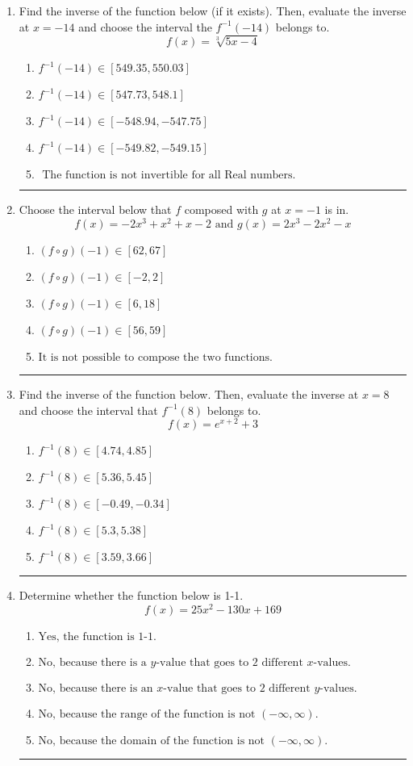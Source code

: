 \documentclass[14pt]{extbook}
\newcommand{\litem}[1]{\item#1\hspace*{-1cm}\rule{\textwidth}{0.4pt}}
\begin{document}
\begin{enumerate}
\litem{
Find the inverse of the function below (if it exists). Then, evaluate the inverse at $x = -14$ and choose the interval the $f^{-1}(-14)$ belongs to.\[ f(x) = \sqrt[3]{5 x - 4} \]\begin{enumerate}[label=\Alph*.]
\item \( f^{-1}(-14) \in [549.35, 550.03] \)
\item \( f^{-1}(-14) \in [547.73, 548.1] \)
\item \( f^{-1}(-14) \in [-548.94, -547.75] \)
\item \( f^{-1}(-14) \in [-549.82, -549.15] \)
\item \( \text{ The function is not invertible for all Real numbers. } \)

\end{enumerate} }
\litem{
Choose the interval below that $f$ composed with $g$ at $x=-1$ is in.\[ f(x) = -2x^{3} + x^{2} +x -2 \text{ and } g(x) = 2x^{3} -2 x^{2} -x \]\begin{enumerate}[label=\Alph*.]
\item \( (f \circ g)(-1) \in [62, 67] \)
\item \( (f \circ g)(-1) \in [-2, 2] \)
\item \( (f \circ g)(-1) \in [6, 18] \)
\item \( (f \circ g)(-1) \in [56, 59] \)
\item \( \text{It is not possible to compose the two functions.} \)

\end{enumerate} }
\litem{
Find the inverse of the function below. Then, evaluate the inverse at $x = 8$ and choose the interval that $f^{-1}(8)$ belongs to.\[ f(x) = e^{x+2}+3 \]\begin{enumerate}[label=\Alph*.]
\item \( f^{-1}(8) \in [4.74, 4.85] \)
\item \( f^{-1}(8) \in [5.36, 5.45] \)
\item \( f^{-1}(8) \in [-0.49, -0.34] \)
\item \( f^{-1}(8) \in [5.3, 5.38] \)
\item \( f^{-1}(8) \in [3.59, 3.66] \)

\end{enumerate} }
\litem{
Determine whether the function below is 1-1.\[ f(x) = 25 x^2 - 130 x + 169 \]\begin{enumerate}[label=\Alph*.]
\item \( \text{Yes, the function is 1-1.} \)
\item \( \text{No, because there is a $y$-value that goes to 2 different $x$-values.} \)
\item \( \text{No, because there is an $x$-value that goes to 2 different $y$-values.} \)
\item \( \text{No, because the range of the function is not $(-\infty, \infty)$.} \)
\item \( \text{No, because the domain of the function is not $(-\infty, \infty)$.} \)


\end{enumerate}}
\end{enumerate}
\end{document}
